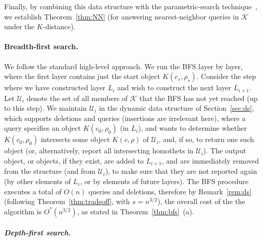 \documentclass[11pt]{article}
\newif\ifsocgproc
\newif\iffullver
\def\reals{{\mathbb R}}
\def\K{\mathcal{K}}
\def\U{\mathcal{U}}
\newtheorem{theorem}{Theorem}[section]
\theoremstyle{definition}
\begin{document}
\fi
%
Finally, by combining this data structure with the parametric-search technique~\cite{AM93}, 
we establish Theorem~\ref{thm:NN} (for answering nearest-neighbor queries in $\K$ under the $K$-distance).
%
%
\iffullver
\section{Breadth-First Search, Reverse Shortest Paths, and Related Problems} 
\label{sec:bfs-rsp}
%
In this section we present applications of our techniques to various basic graph algorithms
on intersection or proximity graphs of a set of homothets in $\reals^3$.
%
In this section we present applications of our techniques to the reverse shortest path problem.
%
\ifsocgproc 
\subparagraph*{Breadth-first search.}
\else
\paragraph{Breadth-first search.}
\fi
We follow the standard high-level approach. We run the BFS layer by layer, where the first layer
contains just the start object $K(c_s,\rho_s)$. Consider the step where we have constructed layer 
$L_i$ and wish to construct the next layer $L_{i+1}$. Let $\U_i$ denote the set of all members of 
$\K$ that the BFS has not yet reached (up to this step). We maintain $\U_i$ in the dynamic data 
structure of Section~\ref{sec:ds}, which supports deletions and queries (insertions are irrelevant 
here), where a query specifies an object $K(c_0,\rho_0)$ 
(in $L_i$), and wants to determine whether $K(c_0,\rho_0)$ intersects some object $K(c,\rho)$ of 
$\U_i$, and, if so, to return one such object (or, alternatively, report all intersecting homothets
in $\U_i$). The output object, or objects, if they exist, are added to $L_{i+1}$,
and are immediately removed from the structure (and from $\U_i$), to make sure that they are not reported 
again (by other elements of $L_i$, or by elements of future layers).
%
The BFS procedure executes a total of $O(n)$ queries and deletions, therefore by Remark~\ref{rem:ds} 
(following Theorem~\ref{thm:tradeoff}, with $s=n^{3/2}$),
the overall cost of the the algorithm is $O^*(n^{3/2})$, as stated in
Theorem~\ref{thm:bfs}~(a).
%
\ifsocgproc
\subparagraph*{Depth-first search.}
\else
\end{document}
